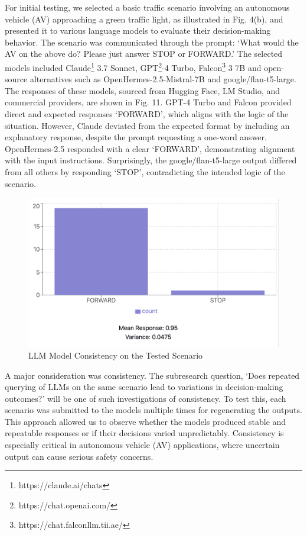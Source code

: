 \documentclass[conference]{IEEEtran}
\begin{document}
For initial testing, we selected a basic traffic scenario involving an autonomous vehicle (AV) approaching a green traffic light, as illustrated in Fig. 4(b), and presented it to various language models to evaluate their decision-making behavior. The scenario was communicated through the prompt: `What would the AV on the above do? Please just answer STOP or FORWARD.' The selected models included Claude\footnote{https://claude.ai/chats} 3.7 Sonnet, GPT\footnote{https://chat.openai.com/}-4 Turbo, Falcon\footnote{https://chat.falconllm.tii.ae/} 3 7B and open-source alternatives such as OpenHermes-2.5-Mistral-7B and google/flan-t5-large. The responses of these models, sourced from Hugging Face, LM Studio, and commercial providers, are shown in Fig. 11. GPT-4 Turbo and Falcon provided direct and expected responses `FORWARD', which aligns with the logic of the situation. However, Claude deviated from the expected format by including an explanatory response, despite the prompt requesting a one-word answer. OpenHermes-2.5 responded with a clear `FORWARD', demonstrating alignment with the input instructions. Surprisingly, the google/flan-t5-large output differed from all others by responding `STOP', contradicting the intended logic of the scenario.

 \begin{figure}[b]
     \centering
     \includegraphics[width=.9\linewidth]{Fig/chart.png}
     \caption{LLM Model Consistency on the Tested Scenario}
     \label{fig:enter-label}
 \end{figure}
 
A major consideration was consistency. The subresearch question, `Does repeated querying of LLMs on the same scenario lead to variations in decision-making outcomes?'  will be one of such investigations of consistency.  To test this, each scenario was submitted to the models multiple times for regenerating the outputs. This approach allowed us to observe whether the models produced stable and repeatable responses or if their decisions varied unpredictably. Consistency is especially critical in autonomous vehicle (AV) applications, where uncertain output can cause serious safety concerns. 
\end{document}
